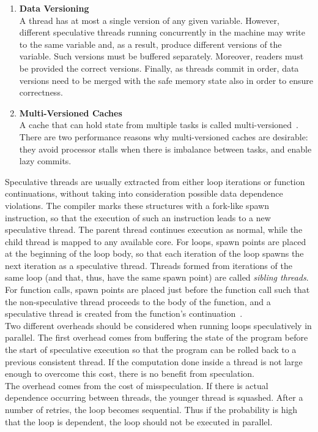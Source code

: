 \documentclass[10pt]{report}          %
\begin{document}
\begin{enumerate}
\item \textbf{Data Versioning} \\
A thread has at most a single version of any given variable. However, different speculative threads running concurrently in the machine may write to the same variable and, as a result, produce different versions of the variable. Such versions must be buffered separately. Moreover, readers must be provided the correct versions. Finally, as threads commit in order, data versions need to be merged with the safe memory state also in order to ensure correctness.
\item \textbf{Multi-Versioned Caches} \\
 A cache that can hold state from multiple tasks is called multi-versioned~\cite{Cintra00,Gopal,steffanISCA00}.\\
There are two performance reasons why multi-versioned caches are desirable: they avoid processor stalls when there is imbalance between tasks, and enable lazy commits.  
\end{enumerate}
 
 Speculative threads are usually extracted from either loop iterations or function continuations, without taking into consideration possible data dependence violations. The compiler marks these
structures with a fork-like spawn instruction, so that the execution
of such an instruction leads to a new speculative thread. The parent thread continues execution as normal, while the child thread is mapped to any available core. For loops, spawn points are placed
at the beginning of the loop body, so that each iteration of the loop spawns the next iteration as a speculative thread. Threads formed from iterations of the same loop (and that, thus, have the
same spawn point) are called \textit{sibling threads}. For function calls, spawn points are placed just before the function call such that the non-speculative thread proceeds to the body of the function, and a speculative thread is created from the function’s continuation~\cite{XekalakisICS09}. \\
Two different overheads should be considered when running loops speculatively in parallel.  The first overhead comes from buffering the state of the program before the start of speculative execution so that the program can be rolled back to a previous consistent thread.  If the computation done inside a thread is not large enough to overcome this cost, there is no benefit from speculation. \\
The overhead comes from the cost of misspeculation.  If there is actual dependence occurring between threads, the younger thread is squashed.  After a number of retries, the loop becomes sequential.  Thus if the probability is high that the loop is dependent, the loop should not be executed in parallel.
 
\end{document}
